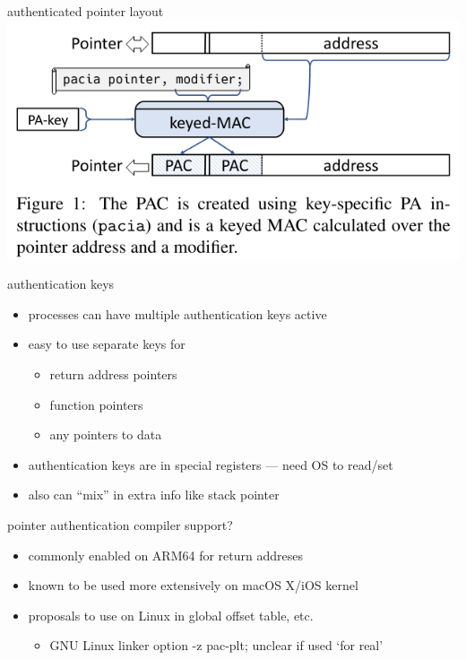 \begin{frame}{authenticated pointer layout}
\includegraphics[width=\textwidth]{../cfi/arm-enc-ptr-fig}
\end{frame}

\begin{frame}{authentication keys}
    \begin{itemize}
    \item processes can have multiple authentication keys active
    \item easy to use separate keys for
        \begin{itemize}
        \item return address pointers
        \item function pointers
        \item any pointers to data
        \end{itemize}
    \item authentication keys are in special registers --- need OS to read/set
    \vspace{.5cm}
    \item also can ``mix'' in extra info like stack pointer
    \end{itemize}
\end{frame}

\begin{frame}{pointer authentication compiler support?}
    \begin{itemize}
    \item commonly enabled on ARM64 for return addreses
    \item known to be used more extensively on macOS X/iOS kernel
    \item proposals to use on Linux in global offset table, etc.
        \begin{itemize}
        \item GNU Linux linker option -z pac-plt; unclear if used `for real'
        \end{itemize}
    \end{itemize}
\end{frame}

